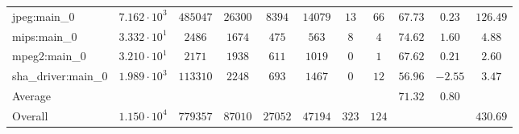 \begin{tabular}{|l|c|c|c|c|c|c|c|c|c|c|}
jpeg:main\_0            & $ 7.162 \cdot 10^{3} $ & $ 485047 $ & $ 26300 $ & $ 8394  $ & $ 14079 $ & $ 13  $ & $ 66  $ & $ 67.73       $ & $ 0.23    $ & $ 126.49  $ \\
mips:main\_0            & $ 3.332 \cdot 10^{1} $ & $ 2486   $ & $ 1674  $ & $ 475   $ & $ 563   $ & $ 8   $ & $ 4   $ & $ 74.62       $ & $ 1.60    $ & $ 4.88    $ \\
mpeg2:main\_0           & $ 3.210 \cdot 10^{1} $ & $ 2171   $ & $ 1938  $ & $ 611   $ & $ 1019  $ & $ 0   $ & $ 1   $ & $ 67.62       $ & $ 0.21    $ & $ 2.60    $ \\
sha\_driver:main\_0     & $ 1.989 \cdot 10^{3} $ & $ 113310 $ & $ 2248  $ & $ 693   $ & $ 1467  $ & $ 0   $ & $ 12  $ & $ 56.96       $ & $ -2.55   $ & $ 3.47    $ \\
\hline
Average                 & $                    $ & $        $ & $       $ & $       $ & $       $ & $     $ & $     $ & $ 71.32       $ & $ 0.80    $ & $         $ \\
\hline
Overall                 & $ 1.150 \cdot 10^{4} $ & $ 779357 $ & $ 87010 $ & $ 27052 $ & $ 47194 $ & $ 323 $ & $ 124 $ & $             $ & $         $ & $ 430.69  $ \\
\hline
\end{tabular}
